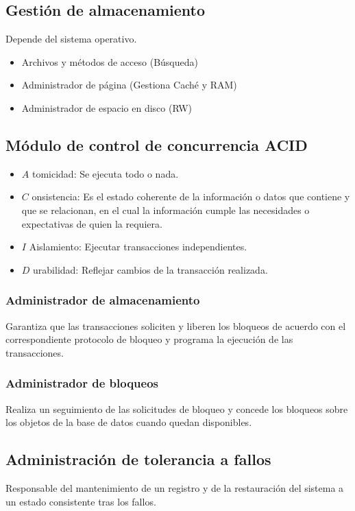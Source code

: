 \documentclass[12pt, fleqn]{report}                             %
\theoremstyle{break}                                            %
\begin{document}
    \subsection{Gestión de almacenamiento}
    Depende del sistema operativo.
    \begin{itemize}
    	\item Archivos y métodos de acceso (Búsqueda)
    	\item Administrador de página (Gestiona Caché y RAM)
    	\item Administrador de espacio en disco (RW)
    \end{itemize}

    \subsection{Módulo de control de concurrencia ACID}
    \begin{itemize}
    	\item $A$ tomicidad: Se ejecuta todo o nada.
    	\item $C$ onsistencia: Es el estado coherente de la información o datos que contiene y que se relacionan, en el cual la información cumple las necesidades o expectativas de quien la requiera.
    	\item $I$ Aislamiento: Ejecutar transacciones independientes.
    	\item $D$ urabilidad: Reflejar cambios de la transacción realizada.
    \end{itemize}
    \subsubsection{Administrador de almacenamiento}
    Garantiza que las transacciones soliciten y liberen los bloqueos de acuerdo con el
	correspondiente protocolo de bloqueo y programa la ejecución de las
	transacciones.
	\subsubsection{Administrador de bloqueos}
	Realiza un seguimiento de las solicitudes de bloqueo y concede los bloqueos
	sobre los objetos de la base de datos cuando quedan disponibles.


    \subsection{Administración de tolerancia a fallos}
    Responsable del mantenimiento de un registro y de la restauración del sistema a un estado consistente tras los fallos.
\end{document}
